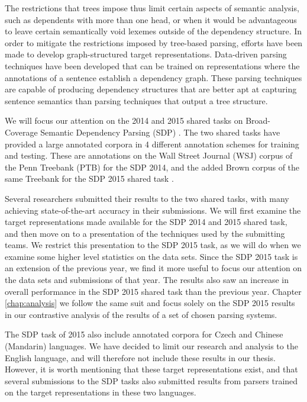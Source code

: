 The restrictions that trees impose thus limit certain aspects of semantic analysis, such as dependents with more than one head, or when it would be advantageous to leave certain semantically void lexemes outside of the dependency structure. In order to mitigate the restrictions imposed by tree-based parsing, efforts have been made to develop graph-structured target representations. Data-driven parsing techniques have been developed that can be trained on representations where the annotations of a sentence establish a dependency graph. These parsing techniques are capable of producing dependency structures that are better apt at capturing sentence semantics than parsing techniques that output a tree structure.

We will focus our attention on the 2014 and 2015 shared tasks on Broad-Coverage Semantic Dependency Parsing (SDP) \cite{Oepen:14, Oepen:15}. The two shared tasks have provided a large annotated corpora in 4 different annotation schemes for training and testing. These are annotations on the Wall Street Journal (WSJ) corpus of the Penn Treebank (PTB) for the SDP 2014, and the added Brown corpus of the same Treebank for the SDP 2015 shared task \cite{Mar:San:Mar:93}.

Several researchers submitted their results to the two shared tasks, with many achieving state-of-the-art accuracy in their submissions. We will first examine the target representations made available for the SDP 2014 and 2015 shared task, and then move on to a presentation of the techniques used by the submitting teams. We restrict this presentation to the SDP 2015 task, as we will do when we examine some higher level statistics on the data sets. Since the SDP 2015 task is an extension of the previous year, we find it more useful to focus our attention on the data sets and submissions of that year. The results also saw an increase in overall performance in the SDP 2015 shared task than the previous year. Chapter \ref{chap:analysis} we follow the same suit and focus solely on the SDP 2015 results in our contrastive analysis of the results of a set of chosen parsing systems.

The SDP task of 2015 also include annotated corpora for Czech and Chinese (Mandarin) languages. We have decided to limit our research and analysis to the English language, and will therefore not include these results in our thesis. However, it is worth mentioning that these target representations exist, and that several submissions to the SDP tasks also submitted results from parsers trained on the target representations in these two languages.

